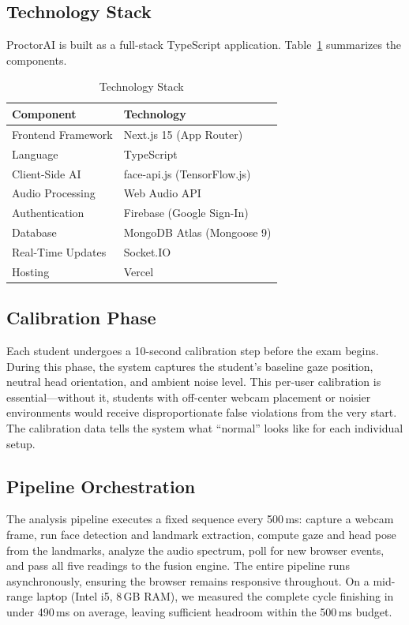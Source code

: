 \documentclass[conference]{IEEEtran}
\begin{document}
\subsection{Technology Stack}

ProctorAI is built as a full-stack TypeScript application. Table~\ref{tab:techstack} summarizes the components.

\begin{table}[htbp]
\caption{Technology Stack}
\label{tab:techstack}
\centering
\renewcommand{\arraystretch}{1.15}
\begin{tabular}{@{}ll@{}}
\toprule
\textbf{Component} & \textbf{Technology} \\
\midrule
Frontend Framework  & Next.js 15 (App Router) \\
Language            & TypeScript \\
Client-Side AI      & face-api.js (TensorFlow.js) \\
Audio Processing    & Web Audio API \\
Authentication      & Firebase (Google Sign-In) \\
Database            & MongoDB Atlas (Mongoose 9) \\
Real-Time Updates   & Socket.IO \\
Hosting             & Vercel \\
\bottomrule
\end{tabular}
\end{table}

\subsection{Calibration Phase}

Each student undergoes a 10-second calibration step before the exam begins. During this phase, the system captures the student's baseline gaze position, neutral head orientation, and ambient noise level. This per-user calibration is essential---without it, students with off-center webcam placement or noisier environments would receive disproportionate false violations from the very start. The calibration data tells the system what ``normal'' looks like for each individual setup.

\subsection{Pipeline Orchestration}

The analysis pipeline executes a fixed sequence every 500\,ms: capture a webcam frame, run face detection and landmark extraction, compute gaze and head pose from the landmarks, analyze the audio spectrum, poll for new browser events, and pass all five readings to the fusion engine. The entire pipeline runs asynchronously, ensuring the browser remains responsive throughout. On a mid-range laptop (Intel i5, 8\,GB RAM), we measured the complete cycle finishing in under 490\,ms on average, leaving sufficient headroom within the 500\,ms budget.
\end{document}
